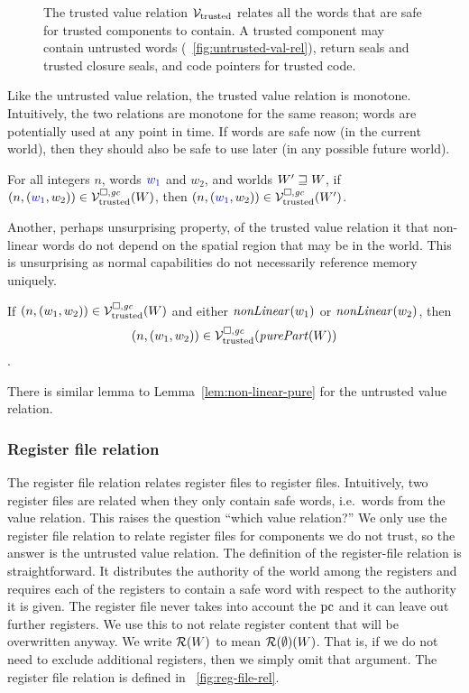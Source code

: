 \begin{jversion}
\begin{figure}
\caption{The trusted value relation $\mathcal{V}_{\mathrm{trusted}}$ relates all the words that are safe for trusted components to contain. A trusted component may contain untrusted words (\figurename~\ref{fig:untrusted-val-rel}), return seals and trusted closure seals, and code pointers for trusted code. }
\label{fig:trusted-val-rel}
\end{figure}
Like the untrusted value relation, the trusted value relation is monotone.
Intuitively, the two relations are monotone for the same reason; words are potentially used at any point in time.
If words are safe now (in the current world), then they should also be safe to use later (in any possible future world).
\begin{lemma}
  \label{lem:monotonicity-trusted}
  For all integers $n$, words ${\color{blue} w_1}$ and $w_2$, and worlds $W' \sqsupseteq W$, if $\left(n,({\color{blue} w_1},w_2)\right) \in \mathcal{V}^{\square,\mathit{gc}}_{\mathrm{trusted}}(W)$, then $\left(n,({\color{blue} w_1},w_2)\right) \in \mathcal{V}^{\square,\mathit{gc}}_{\mathrm{trusted}}(W')$.
\end{lemma}
Another, perhaps unsurprising property, of the trusted value relation it that non-linear words do not depend on the spatial region that may be in the world.
This is unsurprising as normal capabilities do not necessarily reference memory uniquely.
\begin{lemma}
  \label{lem:non-linear-pure}
 If $\left(n,(w_1,w_2)\right) \in \mathcal{V}^{\square,\mathit{gc}}_{\mathrm{trusted}}(W)$ and either $\nonLinear{w_1}$ or $\nonLinear{w_2}$, then
 \[
   \npair{(w_1,w_2)} \in \lrvtrusted(\purePart{W})
 \].
\end{lemma}
There is similar lemma to Lemma~\ref{lem:non-linear-pure} for the untrusted value relation.

\subsubsection{Register file relation}
The register file relation relates \srccm{} register files to \trgcm{} register files.
Intuitively, two register files are related when they only contain safe words, i.e.\ words from the value relation.
This raises the question ``which value relation?''
We only use the register file relation to relate register files for components we do not trust, so the answer is the untrusted value relation.
The definition of the register-file relation is straightforward.
It distributes the authority of the world among the registers and requires each of the registers to contain a safe word with respect to the authority it is given.
The register file never takes into account the $\mathrm{pc}$ and it can leave out further registers.
We use this to not relate register content that will be overwritten anyway.
We write $\mathcal{R}(W)$ to mean $\mathcal{R}(\emptyset)(W)$.
That is, if we do not need to exclude additional registers, then we simply omit that argument.
The register file relation is defined in \figurename~\ref{fig:reg-file-rel}.


\end{jversion}
